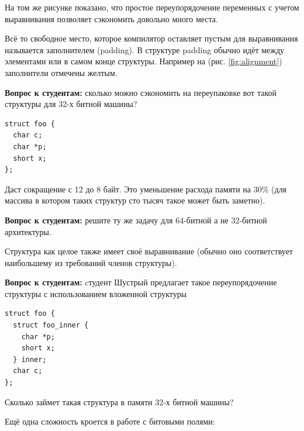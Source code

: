 \documentclass[a4paper,12pt,oneside]{book}
\newif\ifanswers
\begin{document}
На том же рисунке показано, что простое переупорядочение переменных с учетом выравнивания позволяет сэкономить довольно много места.

Всё то свободное место, которое компилятор оставляет пустым для выравнивания называется заполнителем (padding). В структуре padding обычно идёт между элементами или в самом конце структуры. Например на (рис. \ref{fig:alignment}) заполнители отмечены желтым.

\textbf{Вопрос к студентам:} сколько можно сэкономить на переупаковке вот такой структуры для 32-х битной машины?

\begin{lstlisting}
struct foo {
  char c;
  char *p;
  short x;
};
\end{lstlisting}

\ifanswers
Правильный ответ: переупаковка в нисходящем порядке

\begin{lstlisting}
struct foo {
  char *p;
  short x;
  char c;
};
\end{lstlisting}
\fi

Даст сокращение с 12 до 8 байт. Это уменьшение расхода памяти на 30\% (для массива в котором таких структур сто тысяч такое может быть заметно).

\textbf{Вопрос к студентам:} решите ту же задачу для 64-битной а не 32-битной архитектуры.

\ifanswers
Правильный ответ: теперь указатель будет 8 байт и скоращение с 24 до 16 -- те же 30\%
\fi

Структура как целое также имеет своё выравнивание (обычно оно соответствует наибольшему из требований членов структуры).

\textbf{Вопрос к студентам:} cтудент Шустрый предлагает такое переупорядочение структуры с использованием вложенной структуры

\begin{lstlisting}
struct foo {
  struct foo_inner {
    char *p;
    short x;
  } inner;
  char c;
};
\end{lstlisting}

Сколько займет такая структура в памяти 32-х битной машины?

\ifanswers
Ответ: выравнивание внутренней структуры получается 2, а выравнивание внешней структуры 7. Несложный подсчет показывает, что используется целых 16 байт. Немыслимо много. Поэтому с вложенными структурами надо быть осторожней.
\fi

Ещё одна сложность кроется в работе с битовыми полями:
\end{document}
